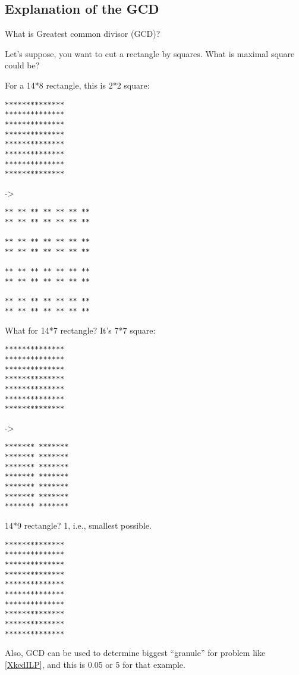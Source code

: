 \subsection{Explanation of the \ac{GCD}}
\label{GCD}

What is Greatest common divisor (\ac{GCD})?

Let's suppose, you want to cut a rectangle by squares. What is maximal square could be?

For a 14*8 rectangle, this is 2*2 square:

\begin{lstlisting}
**************
**************
**************
**************
**************
**************
**************
**************
\end{lstlisting}

->

\begin{lstlisting}
** ** ** ** ** ** **
** ** ** ** ** ** **
                  
** ** ** ** ** ** **
** ** ** ** ** ** **
                  
** ** ** ** ** ** **
** ** ** ** ** ** **
                  
** ** ** ** ** ** **
** ** ** ** ** ** **
\end{lstlisting}

What for 14*7 rectangle? It's 7*7 square:

\begin{lstlisting}
**************
**************
**************
**************
**************
**************
**************
\end{lstlisting}

->

\begin{lstlisting}
******* *******
******* *******
******* *******
******* *******
******* *******
******* *******
******* *******
\end{lstlisting}

14*9 rectangle? 1, i.e., smallest possible.

\begin{lstlisting}
**************
**************
**************
**************
**************
**************
**************
**************
**************
**************
\end{lstlisting}

Also, GCD can be used to determine biggest ``granule'' for problem like \ref{XkcdILP}, and this is 0.05 or 5 for that example.

